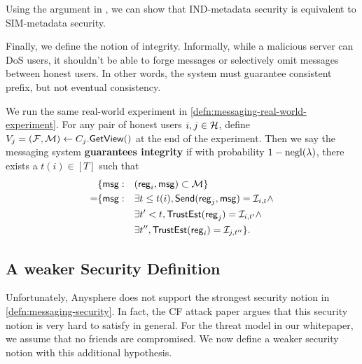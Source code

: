 Using the argument in \cite[Appendix A]{shi2021non}, we can show that IND-metadata security is equivalent to SIM-metadata security.

Finally, we define the notion of integrity. Informally, while a malicious server can DoS users, it shouldn't be able to forge messages  or selectively omit messages between honest users. In other words, the system must guarantee consistent prefix, but not eventual consistency.
\begin{definition}
\label{defn:messaging-integrity}
We run the same real-world experiment in \cref{defn:messaging-real-world-experiment}. For any pair of honest users $i, j \in \mathcal{H}$, define $V_j = (\mathcal{F}, \mathcal{M}) \leftarrow C_j.\mathsf{GetView}()$ at the end of the experiment. Then we say the messaging system \textbf{guarantees integrity} if with probability $1 - \operatorname{negl}(\lambda)$, there exists a $t(i) \in [T]$ such that
\begin{align*}
     &\{\mathsf{msg}: &&(\mathsf{reg}_i, \mathsf{msg}) \subset \mathcal{M}\} \\
      =& \{\mathsf{msg}: &&\exists t \leq t(i), \mathsf{Send}(\mathsf{reg}_j, \mathsf{msg}) = \mathcal{I}_{i, t} \land \\
          &   &&\exists t' < t, \mathsf{TrustEst}(\mathsf{reg}_j) = \mathcal{I}_{i, t'} \land \\
          &   &&\exists t'', \mathsf{TrustEst}(\mathsf{reg}_i) = \mathcal{I}_{j, t''}\}.
\end{align*}
\end{definition}

\subsection{A weaker Security Definition}
\label{subsec:messaging-security-weaker}
Unfortunately, Anysphere does not support the strongest security notion in \cref{defn:messaging-security}. In fact, the CF attack paper \cite{angel2018cf} argues that this security notion is very hard to satisfy in general. For the threat model in our whitepaper, we assume that no friends are compromised. We now define a weaker security notion with this additional hypothesis.


